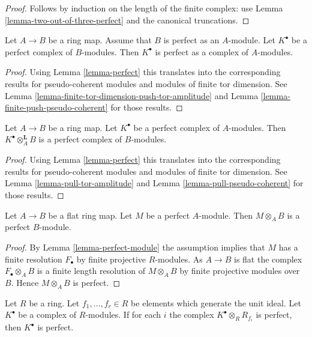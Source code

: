 \begin{proof}
Follows by induction on the length of the finite complex: use
Lemma \ref{lemma-two-out-of-three-perfect}
and the canonical truncations.
\end{proof}

\begin{lemma}
\label{lemma-perfect-push-perfect}
Let $A \to B$ be a ring map. Assume that $B$ is perfect as
an $A$-module. Let $K^\bullet$ be a perfect complex of $B$-modules.
Then $K^\bullet$ is perfect as a complex of $A$-modules.
\end{lemma}

\begin{proof}
Using
Lemma \ref{lemma-perfect}
this translates into the corresponding results for pseudo-coherent modules
and modules of finite tor dimension. See
Lemma \ref{lemma-finite-tor-dimension-push-tor-amplitude}
and
Lemma \ref{lemma-finite-push-pseudo-coherent}
for those results.
\end{proof}

\begin{lemma}
\label{lemma-pull-perfect}
Let $A \to B$ be a ring map.
Let $K^\bullet$ be a perfect
complex of $A$-modules. Then $K^\bullet \otimes_A^{\mathbf{L}} B$
is a perfect complex of $B$-modules. 
\end{lemma}

\begin{proof}
Using
Lemma \ref{lemma-perfect}
this translates into the corresponding results for pseudo-coherent modules
and modules of finite tor dimension. See
Lemma \ref{lemma-pull-tor-amplitude}
and
Lemma \ref{lemma-pull-pseudo-coherent}
for those results.
\end{proof}

\begin{lemma}
\label{lemma-flat-base-change-perfect}
Let $A \to B$ be a flat ring map. Let $M$ be a perfect $A$-module.
Then $M \otimes_A B$ is a perfect $B$-module.
\end{lemma}

\begin{proof}
By
Lemma \ref{lemma-perfect-module}
the assumption implies that $M$ has a finite resolution $F_\bullet$ by
finite projective $R$-modules. As $A \to B$ is flat the complex
$F_\bullet \otimes_A B$ is a finite length resolution of $M \otimes_A B$
by finite projective modules over $B$. Hence $M \otimes_A B$ is perfect.
\end{proof}

\begin{lemma}
\label{lemma-glue-perfect}
Let $R$ be a ring. Let $f_1, \ldots, f_r \in R$ be elements which
generate the unit ideal. Let $K^\bullet$
be a complex of $R$-modules. If for each $i$ the complex
$K^\bullet \otimes_R R_{f_i}$ is perfect,
then $K^\bullet$ is perfect.
\end{lemma}

